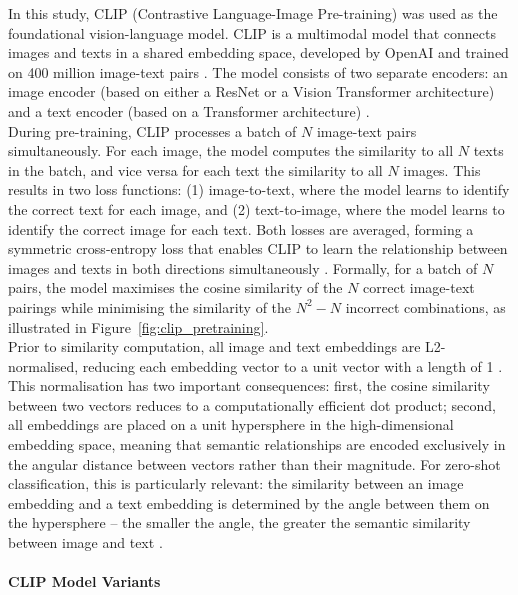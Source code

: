 \documentclass[hidelinks, 11pt]{article}
\begin{document}
In this study, CLIP (Contrastive Language-Image Pre-training) 
\citep{radford_learning_2021} was used as the foundational vision-language model. CLIP is a multimodal model that connects images and texts in a shared embedding space, developed by OpenAI and trained on 400 million image-text pairs \citep{radford2021learning}. The model consists of two separate encoders: an image encoder (based on either a ResNet or a Vision Transformer architecture) and a text encoder (based on a Transformer architecture) \citep{radford2021learning}.
\\
During pre-training, CLIP processes a batch of $N$ image-text pairs 
simultaneously. For each image, the model computes the similarity to all $N$ texts in the batch, and vice versa for each text the similarity to all $N$ images. This results in two loss functions: (1) image-to-text, where the model learns to identify the correct text for each image, and (2) text-to-image, where the model learns to identify the correct image for each text. Both losses are 
averaged, forming a symmetric cross-entropy loss that enables CLIP to learn the relationship between images and texts in both directions simultaneously \citep{radford2021learning}. Formally, for a batch of $N$ pairs, the model maximises the cosine similarity of the $N$ correct image-text pairings while minimising the similarity of the $N^{2}-N$ incorrect combinations, as illustrated 
in Figure~\ref{fig:clip_pretraining}.
\\
Prior to similarity computation, all image and text embeddings are L2-normalised, reducing each embedding vector to a unit vector with a length of 1 \citep{radford2021learning}. This normalisation has two important consequences: first, the cosine similarity between two vectors reduces to a computationally efficient dot product; second, all embeddings are placed on a unit hypersphere 
in the high-dimensional embedding space, meaning that semantic relationships are encoded exclusively in the angular distance between vectors rather than their magnitude. For zero-shot classification, this is particularly relevant: the similarity between an image embedding and a text embedding is determined by the angle between them on the hypersphere -- the smaller the angle, the greater the semantic similarity between image and text \citep{radford2021learning}.


\paragraph{CLIP Model Variants}
\end{document}
